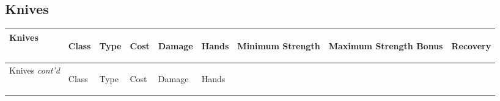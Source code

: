 \documentclass[twoside]{book}
\begin{document}
\subsection{Knives}
    
\begin{longtable}{p{1.25in}llllp{2em}p{3em}p{3em}l} 
  Knives
  &
  \begin{turn}{70}{Class}\end{turn}
          
  &
  \begin{turn}{70}{Type}\end{turn}
          
  &
  \begin{turn}{70}{Cost}\end{turn}
          
  &
  \begin{turn}{70}{Damage}\end{turn}
          
  &
  \begin{turn}{70}{Hands}\end{turn}
          
  &
  \begin{turn}{70}{Minimum Strength}\end{turn}
          
  &
  \begin{turn}{70}{Maximum Strength Bonus}\end{turn}
          
  &
  \begin{turn}{70}{Recovery}\end{turn}
          
  \\
  \hline
  \hline
  \endfirsthead
  Knives \textit{cont'd}
        
  &
  \begin{turn}{70}{Class}\end{turn}
          
  &
  \begin{turn}{70}{Type}\end{turn}
          
  &
  \begin{turn}{70}{Cost}\end{turn}
          
  &
  \begin{turn}{70}{Damage}\end{turn}
          
  &
  \begin{turn}{70}{Hands}\end{turn}
          

\end{longtable}
\end{document}
